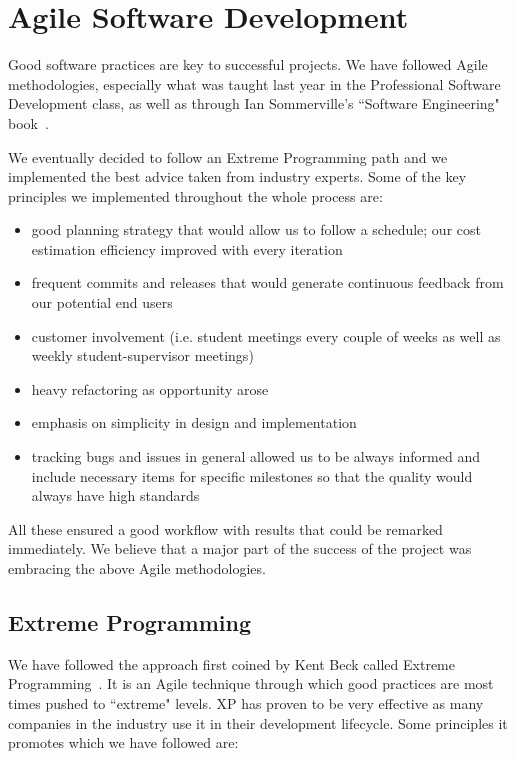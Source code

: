 \documentclass{l4proj}
\begin{document}

\chapter{Agile Software Development}
\label{agile-software-development}

Good software practices are key to successful projects. We have followed Agile methodologies, especially what was
taught last year in the Professional Software Development class, as well as through Ian Sommerville's ``Software Engineering" book~\cite{software-engineering}.

We eventually decided to follow an Extreme Programming path and we implemented the best advice taken from industry
experts. Some of the key principles we implemented throughout the whole process are:
\begin{itemize}
    \item good planning strategy that would allow us to follow a schedule; our cost estimation efficiency improved with every iteration
    \item frequent commits and releases that would generate continuous feedback from our potential end users
    \item customer involvement (i.e. student meetings every couple of weeks as well as weekly student-supervisor meetings)
    \item heavy refactoring as opportunity arose
    \item emphasis on simplicity in design and implementation
    \item tracking bugs and issues in general allowed us to be always informed and include necessary items for specific milestones so that the quality would always have high standards
\end{itemize}

All these ensured a good workflow with results that could be remarked immediately. We believe that a major part of the
success of the project was embracing the above Agile methodologies.

\section{Extreme Programming}

We have followed the approach first coined by Kent Beck called Extreme Programming~\cite{extreme-programming}. It is an
Agile technique through which good practices are most times pushed to ``extreme" levels. XP has proven to be very effective as many companies in the industry use it in their development lifecycle. Some principles it promotes which we have followed are:
\end{document}
